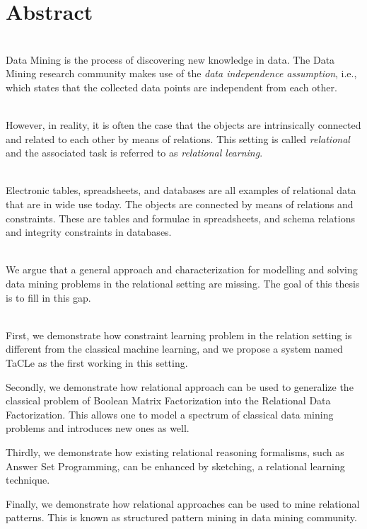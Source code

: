 \chapter{Abstract} \label{ch:abstract}
\\
Data Mining is the process of discovering new knowledge in data.
The Data Mining research community makes use of the  \textit{data
independence assumption}, i.e., which states that the collected data points are independent from each other.

\\
However, in reality, it is often the case that the objects are 
intrinsically connected and related to each other by means of relations. 
This setting is called \textit{relational} and the associated task 
is referred to as \textit{relational learning}.

\\
Electronic tables, spreadsheets, and databases are all examples of
relational data that are in wide use today. The objects are connected
by means of relations and constraints. These are
tables and formulae in spreadsheets, and  schema relations and integrity
constraints in databases.

\\
We argue that a general approach and characterization for modelling and solving data mining  
problems in the relational setting are missing. The goal of this thesis
is to fill in this gap.


\\
First, we demonstrate how constraint learning problem in the relation
setting is different from the classical machine learning, and we
propose a system named TaCLe as the first working in this setting.

Secondly, we demonstrate how relational approach can be used to
generalize the classical problem of Boolean Matrix Factorization into the Relational
Data Factorization. This allows one to model a spectrum of classical data
mining problems and introduces new ones as well.

Thirdly, we demonstrate how existing relational reasoning formalisms,
such as Answer Set Programming, can be enhanced by sketching, a relational learning
technique.

Finally, we demonstrate how relational approaches can be used
to mine relational patterns. This is known as structured pattern mining in
data mining community.


\cleardoublepage

